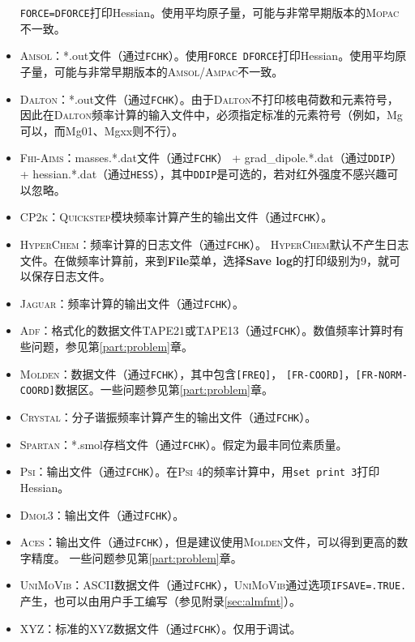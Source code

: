 \documentclass[12pt,a4paper,openany,twoside,cap]{ctexbook}
\begin{document}
\begin{itemize}
\texttt{FORCE=DFORCE}打印Hessian。使用平均原子量，可能与非常早期版本的\textsc{Mopac}不一致。
\item \textsc{Amsol}：*.out文件（通过\verb|FCHK|）。使用\texttt{FORCE DFORCE}打印Hessian。使用平均原子量，可能与非常早期版本的\textsc{Amsol/Ampac}不一致。
\item \textsc{Dalton}：*.out文件（通过\verb|FCHK|）。由于\textsc{Dalton}不打印核电荷数和元素符号，因此在\textsc{Dalton}频率计算的输入文件中，必须指定标准的元素符号（例如，Mg可以，而Mg01、Mgxx则不行）。
\item \textsc{Fhi-Aims}：masses.*.dat文件（通过\verb|FCHK|） + grad{\_}dipole.*.dat（通过\verb|DDIP|） + hessian.*.dat（通过\verb|HESS|），其中\verb|DDIP|是可选的，若对红外强度不感兴趣可以忽略。
\item \textsc{CP2k}：\textsc{Quickstep}模块频率计算产生的输出文件（通过\verb|FCHK|）。
\item \textsc{HyperChem}：频率计算的日志文件（通过\verb|FCHK|）。
\textsc{HyperChem}默认不产生日志文件。在做频率计算前，来到\textbf{File}菜单，选择\textbf{Save log}的打印级别为9，就可以保存日志文件。
\item \textsc{Jaguar}：频率计算的输出文件（通过\verb|FCHK|）。
\item \textsc{Adf}：格式化的数据文件TAPE21或TAPE13（通过\verb|FCHK|）。数值频率计算时有些问题，参见第\ref{part:problem}章。
\item \textsc{Molden}：数据文件（通过\verb|FCHK|），其中包含\verb|[FREQ]|，
\verb|[FR-COORD]|，\verb|[FR-NORM-COORD]|数据区。一些问题参见第\ref{part:problem}章。
\item \textsc{Crystal}：分子谐振频率计算产生的输出文件（通过\verb|FCHK|）。
\item \textsc{Spartan}：*.smol存档文件（通过\verb|FCHK|）。假定为最丰同位素质量。
\item \textsc{Psi}：输出文件（通过\verb|FCHK|）。在\textsc{Psi} 4的频率计算中，用\texttt{set print 3}打印Hessian。
\item \textsc{Dmol3}：输出文件（通过\verb|FCHK|）。
\item \textsc{Aces}：输出文件（通过\verb|FCHK|），但是建议使用\textsc{Molden}文件，可以得到更高的数字精度。 一些问题参见第\ref{part:problem}章。
\item \textsc{UniMoVib}：ASCII数据文件（通过\verb|FCHK|），\textsc{UniMoVib}通过选项\verb|IFSAVE=.TRUE.|产生，也可以由用户手工编写（参见附录\ref{sec:almfmt}）。
\item XYZ：标准的XYZ数据文件（通过\verb|FCHK|）。仅用于调试。
\end{itemize}
\end{document}
